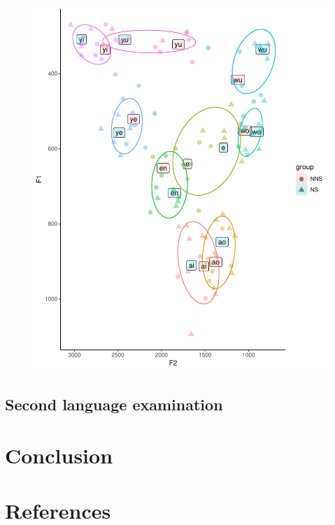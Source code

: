 \documentclass[man, fleqn, noextraspace]{apa6}
\begin{document}
\begin{figure}
\centering
\includegraphics{Vowel_v2_files/figure-latex/figure3-1.pdf}
\caption{}
\end{figure}

\subsection{Second language
examination}\label{second-language-examination}

\section{Conclusion}\label{conclusion}

\newpage

\section{References}\label{references}
\end{document}
